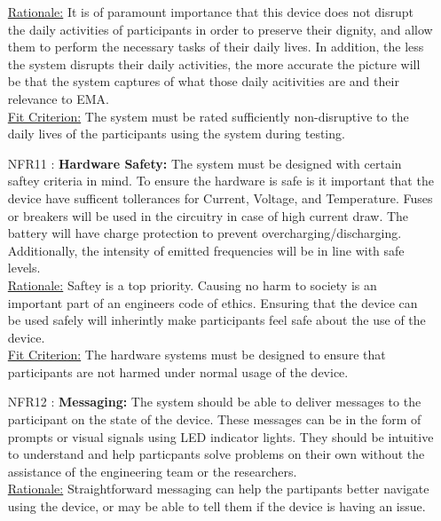 \documentclass[12pt]{article}
\begin{document}
\begin{itemize}
\underline{Rationale:} It is of paramount importance that this device does not disrupt the daily activities of participants in order to preserve their dignity, and allow them to perform the necessary tasks of their daily lives. In addition, the less the system disrupts their daily activities, the more accurate the picture will be that the system captures of what those daily acitivities are and their relevance to EMA.\\

\underline{Fit Criterion:} The system must be rated sufficiently non-disruptive to the daily lives of the participants using the system during testing.\\

\item[NFR11 \label{NFR11}:]
  \textbf{Hardware Safety:} The system must be designed with certain saftey criteria in mind. To ensure the hardware is safe is it important that the device have sufficent tollerances for Current, Voltage, and Temperature. Fuses or breakers will be used in the circuitry in case of high current draw. The battery will have charge protection to prevent overcharging/discharging. Additionally, the intensity of emitted frequencies will be in line with safe levels.\\

\underline{Rationale:} Saftey is a top priority. Causing no harm to society is an important part of an engineers code of ethics. Ensuring that the device can be used safely will inherintly make participants feel safe about the use of the device.\\

\underline{Fit Criterion:} The hardware systems must be designed to ensure that participants are not harmed under normal usage of the device.\\

\item[NFR12 \label{NFR12}:]
  \textbf{Messaging:} The system should be able to deliver messages to the participant on the state of the device. These messages can be in the form of prompts or visual signals using LED indicator lights. They should be intuitive to understand and help particpants solve problems on their own without the assistance of the engineering team or the researchers.\\

\underline{Rationale:} Straightforward messaging can help the partipants better navigate using the device, or may be able to tell them if the device is having an issue.\\


\end{itemize}
\end{document}
